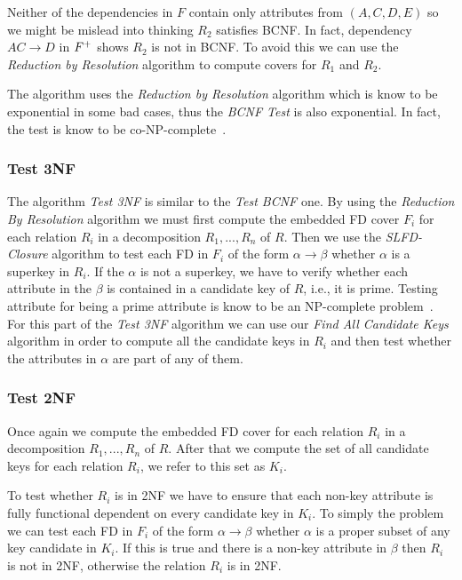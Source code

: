 Neither of the dependencies in $F$ contain only attributes from
$(A,C,D,E)$ so we might be mislead into thinking $R_2$ satisfies BCNF. In fact, 
dependency $AC \rightarrow D$ in $F\sp{+}$ shows $R_2$ is not in BCNF. To avoid this we can
use the \textit{Reduction by Resolution} algorithm to compute covers for $R_1$ and $R_2$. 

The algorithm uses the \textit{Reduction by Resolution} algorithm which is know to be exponential
in some bad cases, thus the \textit{BCNF Test} is also exponential. In fact, the test is know to 
be co-NP-complete~\cite{p4}.

\subsubsection{Test 3NF}
The algorithm \textit{Test 3NF} is similar to the \textit{Test BCNF} one. 
By using the \textit{Reduction By Resolution} algorithm
we must first compute the
embedded FD cover $F_i$ for each relation $R_i$ in a decomposition $R_1,...,R_n$ of $R$. Then we use 
the \textit{SLFD-Closure} algorithm to test each FD in $F_i$ of the form $\alpha \rightarrow \beta$ 
whether $\alpha$ is a superkey in $R_i$. 
If the $\alpha$ is not a superkey, we have to verify whether each attribute in the $\beta$ 
is contained in a candidate key of $R$, i.e., it is prime. Testing attribute for being a prime
attribute is know to be an NP-complete problem~\cite{p3}. For this part of the \textit{Test 3NF} algorithm
we can use our \textit{Find All Candidate Keys} algorithm in order
to compute all the candidate keys in $R_i$ and then test whether the attributes in $\alpha$ are part of any 
of them.

\subsubsection{Test 2NF}
Once again we compute the
embedded FD cover for each relation $R_i$ in a decomposition $R_1,...,R_n$ of $R$. After that 
we compute the set of all candidate keys for each relation $R_i$, we refer to this set as $K_i$.
 
To test whether $R_i$ is in 2NF we have to ensure that each non-key attribute is fully
functional dependent on every candidate key in $K_i$. To simply the problem we can test
each FD in $F_i$ of the form $\alpha \rightarrow \beta$ whether $\alpha$ is a proper subset
of any key candidate in $K_i$. If this is true and there is a non-key attribute in $\beta$ then
$R_i$ is not in 2NF, otherwise the relation $R_i$ is in 2NF.

